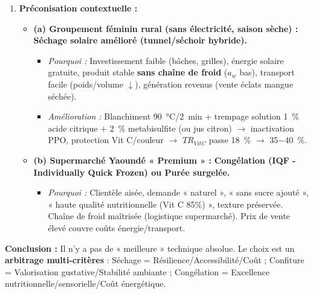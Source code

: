 \documentclass[11pt]{article}
\begin{document}
\begin{exoresolu}
\begin{enumerate}
\begin{itemize}
                \item \textbf{Sensoriel :} Congélation (proche frais) $>$ Confiture (produit nouveau, apprécié) $>$ Séchage (texture altérée, couleur brunie, goût concentré/oxydé).
            \end{itemize}
        \item \textbf{Préconisation contextuelle :}
            \begin{itemize}
                \item \textbf{(a) Groupement féminin rural (sans électricité, saison sèche) :} \textbf{Séchage solaire amélioré (tunnel/séchoir hybride).}
                    \begin{itemize}
                        \item \emph{Pourquoi :} Investissement faible (bâches, grilles), énergie solaire gratuite, produit stable \textbf{sans chaîne de froid} ($a_w$ bas), transport facile (poids/volume $\downarrow$), génération revenus (vente éclats mangue séchée). 
                        \item \emph{Amélioration :} Blanchiment \SI{90}{\celsius}/\SI{2}{min} + trempage solution \SI{1}{\%} acide citrique + \SI{2}{\%} metabisulfite (ou jus citron) $\rightarrow$ inactivation PPO, protection Vit C/couleur $\rightarrow$ $TR_{VitC}$ passe \SI{18}{\%} $\rightarrow$ \SI{35-40}{\%}.
                    \end{itemize}
                \item \textbf{(b) Supermarché Yaoundé « Premium » :} \textbf{Congélation (IQF - Individually Quick Frozen) ou Purée surgelée.}
                    \begin{itemize}
                        \item \emph{Pourquoi :} Clientèle aisée, demande « naturel », « sans sucre ajouté », « haute qualité nutritionnelle (Vit C 85\%) », texture préservée. Chaîne de froid maîtrisée (logistique supermarché). Prix de vente élevé couvre coûts énergie/transport.
                    \end{itemize}
            \end{itemize}
    \end{enumerate}
    \textbf{Conclusion :} Il n'y a pas de « meilleure » technique absolue. Le choix est un \textbf{arbitrage multi-critères} : Séchage = Résilience/Accessibilité/Coût ; Confiture = Valorisation gustative/Stabilité ambiante ; Congélation = Excellence nutritionnelle/sensorielle/Coût énergétique.
\end{exoresolu}
\end{document}
